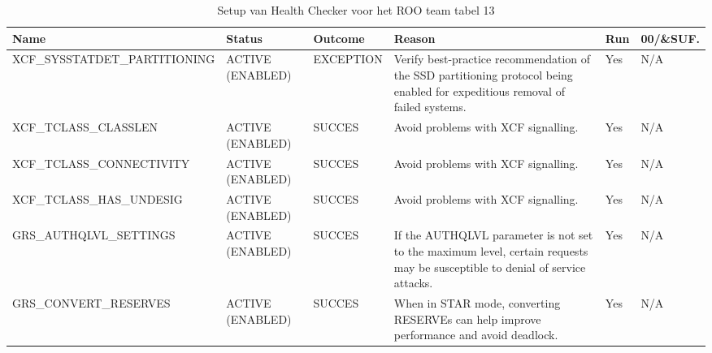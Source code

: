 \begin{landscape}
	\begin{table}[h]
		\begin{tabular}{|l|p{2.3cm}|l|p{4.5cm}|l|l|}
			\hline
			\textbf{Name}                       & \textbf{Status}   & \textbf{Outcome} & \textbf{Reason}    & \textbf{Run} &	\textbf{00/\&SUF.} \\ \hline
			XCF\_SYSSTATDET\_PARTITIONING & ACTIVE (ENABLED) & EXCEPTION & Verify best-practice recommendation of the SSD partitioning   protocol being enabled for expeditious removal of failed systems.  & Yes & N/A \\ \hline
			XCF\_TCLASS\_CLASSLEN         & ACTIVE (ENABLED) & SUCCES    & Avoid   problems with XCF signalling.                                                                                            & Yes & N/A \\ \hline
			XCF\_TCLASS\_CONNECTIVITY     & ACTIVE (ENABLED) & SUCCES    & Avoid   problems with XCF signalling.                                                                                            & Yes & N/A \\ \hline
			XCF\_TCLASS\_HAS\_UNDESIG     & ACTIVE (ENABLED) & SUCCES    & Avoid   problems with XCF signalling.                                                                                            & Yes & N/A \\ \hline
			GRS\_AUTHQLVL\_SETTINGS       & ACTIVE (ENABLED) & SUCCES    & If the   AUTHQLVL parameter is not set to the maximum level, certain requests may be   susceptible to denial of service attacks. & Yes & N/A \\ \hline
			GRS\_CONVERT\_RESERVES        & ACTIVE (ENABLED) & SUCCES    & When in   STAR mode, converting RESERVEs can help improve performance and avoid   deadlock.                                      & Yes & N/A \\ \hline
		\end{tabular}
		\caption[Health Checker ROO team tabel 13]{Setup van Health Checker voor het ROO team tabel 13}
		\label{tbl:ROO Team Tabel 13}
	\end{table}
\end{landscape}

